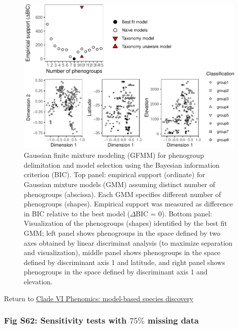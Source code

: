 \documentclass[
  11pt,
]{article}
\begin{document}
\begin{figure}
\includegraphics{Supplementary_Material_files/figure-latex/cladeVImorphologicalDelimitationPlots-1} \caption{Gaussian finite mixture modeling (GFMM) for phenogroup delimitation and model selection using the Bayesian information criterion (BIC). Top panel: empirical support (ordinate) for Gaussian mixture models (GMM) assuming distinct number of phenogroups (abscissa). Each GMM specifies different number of phenogroups (shapes). Empirical support was measured as difference in BIC relative to the best model ($\Delta$BIC = $0$). Bottom panel: Visualization of the phenogroups (shapes) identified by the best fit GMM; left panel shows phenogroups in the space defined by two axes obtained by linear discriminat analysis (to maximize separation and visualization), middle panel shows phenogroups in the space defined by discriminant axis 1 and latitude, and right panel shows phenogroups in the space defined by discriminant axis 1 and elevation.}\label{fig:cladeVImorphologicalDelimitationPlots}
\end{figure}

Return to \protect\hyperlink{model-based-species-discovery-10}{Clade VI Phenomics: model-based species discovery}
\pagebreak

\hypertarget{fig-s62-sensitivity-tests-with-75-missing-data}{%
\subsubsection{\texorpdfstring{Fig S62: Sensitivity tests with \(75\%\) missing data}{Fig S62: Sensitivity tests with 75\textbackslash\% missing data}}\label{fig-s62-sensitivity-tests-with-75-missing-data}}
\end{document}
